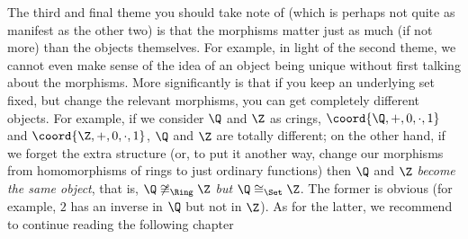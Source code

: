 The third and final theme you should take note of (which is perhaps not quite as manifest as the other two) is that the morphisms matter just as much (if not more) than the objects themselves.  For example, in light of the second theme, we cannot even make sense of the idea of an object being unique without first talking about the morphisms.  More significantly is that if you keep an underlying set fixed, but change the relevant morphisms, you can get completely different objects.  For example, if we consider $\Q$ and $\Z$ as crings, $\coord{\Q ,+,0,\cdot ,1}$ and $\coord{\Z ,+,0,\cdot ,1}$, $\Q$ and $\Z$ are totally different; on the other hand, if we forget the extra structure (or, to put it another way, change our morphisms from homomorphisms of rings to just ordinary functions) then $\Q$ and $\Z$ \emph{become the same object}, that is, $\Q \not \cong _{\Ring}\Z$ \emph{but} $\Q \cong _{\Set}\Z$.  The former is obvious (for example, $2$ has an inverse in $\Q$ but not in $\Z$).  As for the latter, we recommend to continue reading the following chapter\textellipsis